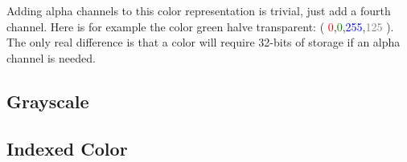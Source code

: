 \newcommand{\rgbaquad}[4]{(
  \textcolor{red}{#1},\textcolor{green}{#2},\textcolor{blue}{#3},\textcolor{gray}{#4} )}

Adding alpha channels to this color representation is trivial, just
add a fourth channel. Here is for example the color green halve
transparent: \rgbaquad{0}{0}{255}{125}. The only real difference is
that a color will require 32-bits of storage if an alpha channel is needed.

\subsection{Grayscale}
\label{sec:other-colors-depths}


\subsection{Indexed Color}
\label{sec:indexed-color}


\printbibliography[heading=subbibliography]
